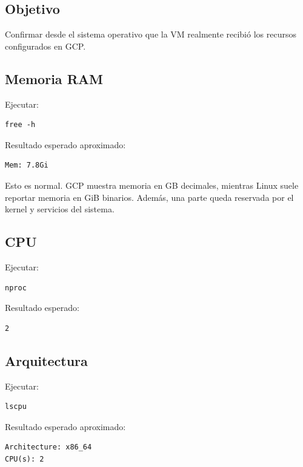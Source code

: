 \documentclass[
  coursetitle={Cómputo Nube y Tecnologías Emergentes},
  coursehours={96},
  coursedate={Verano 2026},
  doctype={Laboratorio},
  otherlangs={english,french},
  authorname={Lázaro},
  authorsurname={Bustio-Martínez},
  authortitle={PhD},
  role={Profesor Investigador},
  email={lbustio@inaoe.mx},
  phone={5559504000},
  ext={7459},
  institution={Instituto Nacional de Astrofísica, Óptica y Electrónica (INAOE)},
  department={Maestría en Ciencias en Tecnologías de Seguridad},
  address={Luis Enrique Erro 1, Sta. Ma. Tonantzintla, San Andrés Cholula, CP 72840, Puebla, México},
  margin={0.5in}
]{../../lbustio_lecture_notes}
\begin{document}
\subsection{Objetivo}

Confirmar desde el sistema operativo que la VM realmente recibió los recursos configurados en GCP.

\subsection{Memoria RAM}

Ejecutar:

\begin{lstlisting}
free -h
\end{lstlisting}

Resultado esperado aproximado:

\begin{verbatim}
Mem: 7.8Gi
\end{verbatim}

Esto es normal. GCP muestra memoria en GB decimales, mientras Linux suele reportar memoria en GiB binarios. Además, una parte queda reservada por el kernel y servicios del sistema.

\subsection{CPU}

Ejecutar:

\begin{lstlisting}
nproc
\end{lstlisting}

Resultado esperado:

\begin{verbatim}
2
\end{verbatim}

\subsection{Arquitectura}

Ejecutar:

\begin{lstlisting}
lscpu
\end{lstlisting}

Resultado esperado aproximado:

\begin{verbatim}
Architecture: x86_64
CPU(s): 2
\end{verbatim}
\end{document}
